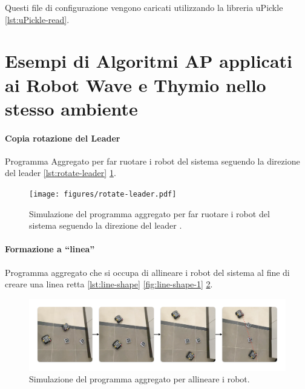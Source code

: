 \documentclass[12pt,a4paper,openright,twoside]{book}
\begin{document}




Questi file di configurazione vengono caricati utilizzando la libreria uPickle \cite{uPickle} \cref{lst:uPickle-read}.




\section{Esempi di Algoritmi AP applicati ai Robot Wave e Thymio nello stesso ambiente}

\paragraph{Copia rotazione del Leader}
Programma Aggregato per far ruotare i robot del sistema seguendo la direzione del leader \cref{lst:rotate-leader} \cref{fig:rotate-leader}.



\begin{figure}
    \centering
    \texttt{[image: figures/rotate-leader.pdf]}
    \caption{Simulazione del programma aggregato per far ruotare i robot del sistema seguendo la direzione del leader .}
    \label{fig:rotate-leader}
\end{figure}

\paragraph{Formazione a ``linea''}
Programma aggregato che si occupa di allineare i robot del sistema al fine di creare una linea retta \cref{lst:line-shape} \cref{fig:line-shape-1} \cref{fig:line-shape-2}.



\begin{figure}
    \centering
    \includegraphics[width=.99\linewidth]{figures/line2.pdf}
    \caption{Simulazione del programma aggregato per allineare i robot.}
    \label{fig:line-shape-2}
\end{figure}
\end{document}
